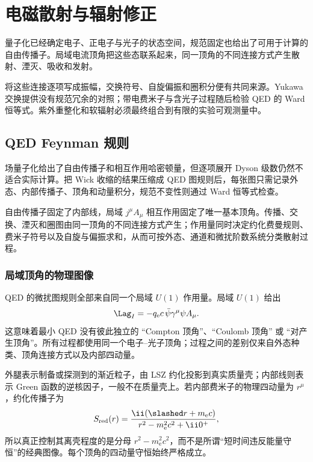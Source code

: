 \chapter{电磁散射与辐射修正}\label{chap:electromagnetic-scattering}

量子化已经确定电子、正电子与光子的状态空间，规范固定也给出了可用于计算的自由传播子。局域电流顶角把这些态联系起来，同一顶角的不同连接方式产生散射、湮灭、吸收和发射。

将这些连接逐项写成振幅，交换符号、自旋偏振和圈积分便有共同来源。Yukawa 交换提供没有规范冗余的对照；带电费米子与含光子过程随后检验 QED 的 Ward 恒等式。紫外重整化和软辐射必须最终组合到有限的实验可观测量中。

\section{QED Feynman 规则}\label{sec:feqo-light-coupling}

场量子化给出了自由传播子和相互作用哈密顿量，但逐项展开 Dyson 级数仍然不适合实际计算。把 Wick 收缩的结果压缩成 QED 图规则后，每张图只需记录外态、内部传播子、顶角和动量积分，规范不变性则通过 Ward 恒等式检查。

自由传播子固定了内部线，局域 $j^\mu A_\mu$ 相互作用固定了唯一基本顶角。传播、交换、湮灭和圈图由同一顶角的不同连接方式产生；作用量同时决定约化费曼规则、费米子符号以及自旋与偏振求和，从而可按外态、通道和微扰阶数系统分类散射过程。

\subsection{局域顶角的物理图像}

QED 的微扰图规则全部来自同一个局域 $U(1)$ 作用量。局域 $U(1)$ 给出
\begin{equation}
 \Lag_I=-q_{\mathrm e} c\,\bar\psi\gamma^\mu\psi A_\mu .
 \label{eq:qed-one-vertex-mainline-dp7}
\end{equation}
这意味着最小 QED 没有彼此独立的 ``Compton 顶角''、``Coulomb 顶角'' 或 ``对产生顶角''。所有过程都使用同一个电子--光子顶角；过程之间的差别仅来自外态种类、顶角连接方式以及内部四动量。

外腿表示制备或探测到的渐近粒子，由 LSZ 约化投影到真实质量壳；内部线则表示 Green 函数的逆核因子，一般不在质量壳上。若内部费米子的物理四动量为 $r^\mu$，约化传播子为
\begin{equation*}
 S_{\rm red}(r)
 =\frac{\ii(\slashed r+m_{\mathrm e} c)}{r^2-m_{\mathrm e}^2c^2+\ii0^+},
\end{equation*}
所以真正控制其离壳程度的是分母 $r^2-m_{\mathrm e}^2c^2$，而不是所谓“短时间违反能量守恒”的经典图像。每个顶角的四动量守恒始终严格成立。

